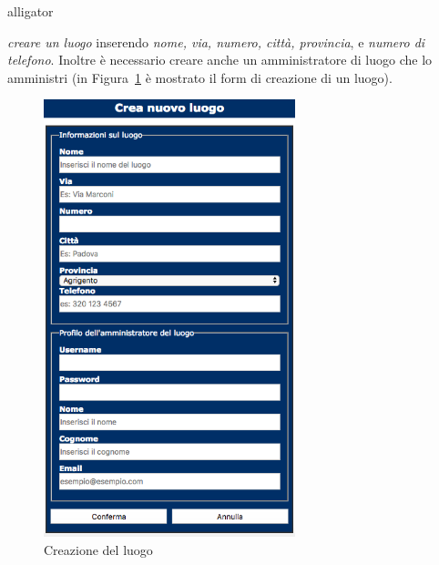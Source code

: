 \documentclass[10pt, a4paper]{article}
\begin{document}
\begin{labeling}{alligator}
	\item[\emph{creare un luogo}] inserendo \emph{nome, via, numero,
	 città, provincia}, e \emph{numero di telefono}. Inoltre è necessario
 	 creare anche un amministratore di luogo che lo amministri 
 	 (in Figura~\ref{fig:creazione_luogo} è mostrato il form di creazione di un
 	 luogo).
 	 \begin{figure}[h!]
 	 	\centering
 	 	\includegraphics[width=0.65\textwidth]{Images/creazione_luogo.png}
 	 	\caption{Creazione del luogo}
 	 	\label{fig:creazione_luogo}
 	 \end{figure}
  

\end{labeling}
\end{document}
